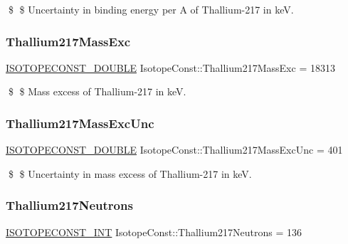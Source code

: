 \$ \$ Uncertainty in binding energy per A of Thallium-\/217 in keV. \mbox{\label{group___isotope_const-_thallium-_tl217_ga3e5ada4479ed86f1e79dc4f94006e35f}} 
\subsubsection{\texorpdfstring{Thallium217\+Mass\+Exc}{Thallium217MassExc}}
{\footnotesize\ttfamily \mbox{\hyperlink{group___isotope_const-_macros_ga8f45a7272ce02c0b4c65c44636ed719a}{I\+S\+O\+T\+O\+P\+E\+C\+O\+N\+S\+T\+\_\+\+D\+O\+U\+B\+LE}} Isotope\+Const\+::\+Thallium217\+Mass\+Exc = 18313}

\$ \$ Mass excess of Thallium-\/217 in keV. \mbox{\label{group___isotope_const-_thallium-_tl217_ga82ee10a7dfd7dd322b557824e4172a26}} 
\subsubsection{\texorpdfstring{Thallium217\+Mass\+Exc\+Unc}{Thallium217MassExcUnc}}
{\footnotesize\ttfamily \mbox{\hyperlink{group___isotope_const-_macros_ga8f45a7272ce02c0b4c65c44636ed719a}{I\+S\+O\+T\+O\+P\+E\+C\+O\+N\+S\+T\+\_\+\+D\+O\+U\+B\+LE}} Isotope\+Const\+::\+Thallium217\+Mass\+Exc\+Unc = 401}

\$ \$ Uncertainty in mass excess of Thallium-\/217 in keV. \mbox{\label{group___isotope_const-_thallium-_tl217_gaba905167ac3241dca134992c13e02c37}} 
\subsubsection{\texorpdfstring{Thallium217\+Neutrons}{Thallium217Neutrons}}
{\footnotesize\ttfamily \mbox{\hyperlink{group___isotope_const-_macros_ga5f18360b3e99483a35c32d789e62621c}{I\+S\+O\+T\+O\+P\+E\+C\+O\+N\+S\+T\+\_\+\+I\+NT}} Isotope\+Const\+::\+Thallium217\+Neutrons = 136}

